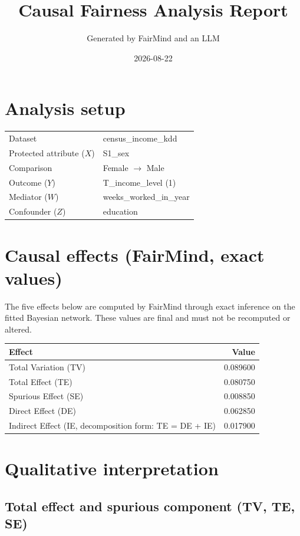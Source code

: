 \documentclass[11pt]{article}
\title{Causal Fairness Analysis Report}
\author{Generated by FairMind and an LLM}
\date{2026-08-22}
\begin{document}
\maketitle

\section{Analysis setup}

\begin{tabular}{ll}
\toprule
Dataset & census\_income\_kdd \\
Protected attribute ($X$) & S1\_sex \\
Comparison & Female $\to$ Male \\
Outcome ($Y$) & T\_income\_level (1) \\
Mediator ($W$) & weeks\_worked\_in\_year \\
Confounder ($Z$) & education \\
\bottomrule
\end{tabular}

\section{Causal effects (FairMind, exact values)}

The five effects below are computed by FairMind through exact inference on the
fitted Bayesian network. These values are final and must not be recomputed or
altered.

\begin{tabular}{lr}
\toprule
Effect & Value \\
\midrule
Total Variation (TV) & 0.089600 \\
Total Effect (TE) & 0.080750 \\
Spurious Effect (SE) & 0.008850 \\
Direct Effect (DE) & 0.062850 \\
Indirect Effect (IE, decomposition form: TE = DE + IE) & 0.017900 \\
\bottomrule
\end{tabular}

\section{Qualitative interpretation}

\subsection{Total effect and spurious component (TV, TE, SE)}
\end{document}
